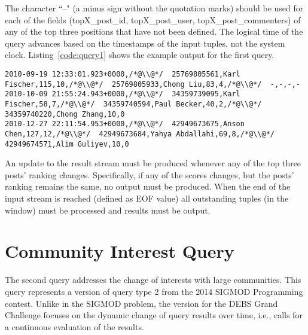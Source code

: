 \documentclass{sig-alternate}
\begin{document}
The character ``--" (a minus sign without the quotation marks) should be used for each of the fields (topX\_post\_id, topX\_post\_user, topX\_post\_commenters) of any of the top three positions that have not been defined. The logical time of the query advances based on the timestamps of the input tuples, not the system clock. Listing~\ref{code:query1} shows the example output for the first query.

\begin{lstlisting}[float=ht,caption={Output example for the three top scoring posts query},label={code:query1}]
2010-09-19 12:33:01.923+0000,/*@\\@*/  25769805561,Karl Fischer,115,10,/*@\\@*/  25769805933,Chong Liu,83,4,/*@\\@*/  -,-,-,-
2010-10-09 21:55:24.943+0000,/*@\\@*/  34359739095,Karl Fischer,58,7,/*@\\@*/  34359740594,Paul Becker,40,2,/*@\\@*/  34359740220,Chong Zhang,10,0
2010-12-27 22:11:54.953+0000,/*@\\@*/  42949673675,Anson Chen,127,12,/*@\\@*/  42949673684,Yahya Abdallahi,69,8,/*@\\@*/  42949674571,Alim Guliyev,10,0
\end{lstlisting}

An update to the result stream must be produced whenever any of the top three posts' ranking changes. Specifically, if any of the scores changes, but the posts' ranking remains the same, no output must be produced. When the end of the input stream is reached (defined as EOF value) all outstanding tuples (in the window) must be processed and results must be output. 

\section{Community Interest Query}
\label{sec:query2}
The second query addresses the change of interests with large communities. This query represents a version of query type 2 from the 2014 SIGMOD Programming contest. Unlike in the SIGMOD problem, the version for the DEBS Grand Challenge focuses on the dynamic change of query results over time, i.e., calls for a continuous evaluation of the results. 
\end{document}
